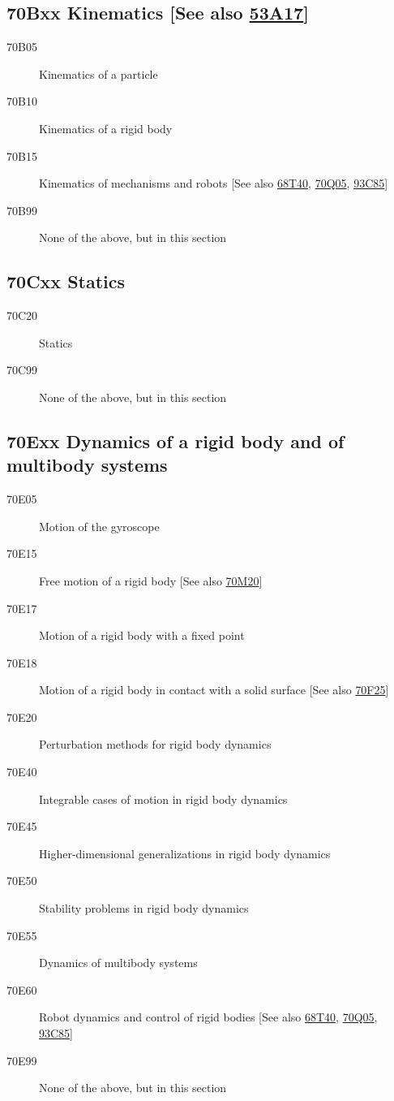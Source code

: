 \subsection*{70Bxx  Kinematics [See also \hyperref[53A17]{53A17}] }\label{70Bxx}
\begin{description}  
\item [70B05]\label{70B05} Kinematics of a particle
\item [70B10]\label{70B10} Kinematics of a rigid body
\item [70B15]\label{70B15} Kinematics of mechanisms and robots [See also \hyperref[68T40]{68T40}, \hyperref[70Q05]{70Q05}, \hyperref[93C85]{93C85}]
\item [70B99]\label{70B99} None of the above, but in this section
\end{description}
\subsection*{70Cxx  Statics }\label{70Cxx}
\begin{description}  
\item [70C20]\label{70C20} Statics
\item [70C99]\label{70C99} None of the above, but in this section
\end{description}
\subsection*{70Exx  Dynamics of a rigid body and of multibody systems }\label{70Exx}
\begin{description}  
\item [70E05]\label{70E05} Motion of the gyroscope
\item [70E15]\label{70E15} Free motion of a rigid body [See also \hyperref[70M20]{70M20}]
\item [70E17]\label{70E17} Motion of a rigid body with a fixed point
\item [70E18]\label{70E18} Motion of a rigid body in contact with a solid surface [See also \hyperref[70F25]{70F25}]
\item [70E20]\label{70E20} Perturbation methods for rigid body dynamics
\item [70E40]\label{70E40} Integrable cases of motion in rigid body dynamics
\item [70E45]\label{70E45} Higher-dimensional generalizations in rigid body dynamics
\item [70E50]\label{70E50} Stability problems in rigid body dynamics
\item [70E55]\label{70E55} Dynamics of multibody systems
\item [70E60]\label{70E60} Robot dynamics and control of rigid bodies [See also \hyperref[68T40]{68T40}, \hyperref[70Q05]{70Q05}, \hyperref[93C85]{93C85}]
\item [70E99]\label{70E99} None of the above, but in this section
\end{description}

